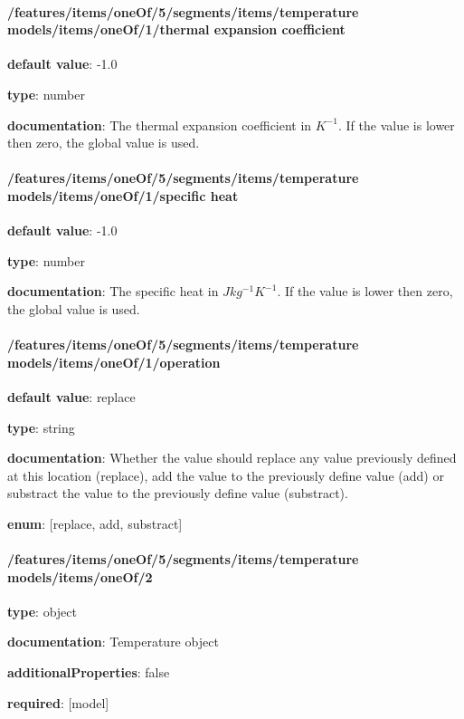 \begin{itemized}
\end{itemized}\paragraph{/features/items/oneOf/5/segments/items/temperature models/items/oneOf/1/thermal expansion coefficient} \begin{itemized}
\item {\bf default value}: -1.0
\item {\bf type}: number
\item {\bf documentation}: The thermal expansion coefficient in $K^{-1}$. If the value is lower then zero, the global value is used.
\end{itemized}\paragraph{/features/items/oneOf/5/segments/items/temperature models/items/oneOf/1/specific heat} \begin{itemized}
\item {\bf default value}: -1.0
\item {\bf type}: number
\item {\bf documentation}: The specific heat in $J kg^{-1} K^{-1}$. If the value is lower then zero, the global value is used.
\end{itemized}\paragraph{/features/items/oneOf/5/segments/items/temperature models/items/oneOf/1/operation} \begin{itemized}
\item {\bf default value}: replace
\item {\bf type}: string
\item {\bf documentation}: Whether the value should replace any value previously defined at this location (replace), add the value to the previously define value (add) or substract the value to the previously define value (substract).
\item {\bf enum}: [replace, add, substract]\end{itemized}\paragraph{/features/items/oneOf/5/segments/items/temperature models/items/oneOf/2} \begin{itemized}
\item {\bf type}: object
\item {\bf documentation}: Temperature object
\item {\bf additionalProperties}: false
\item {\bf required}: [model]\end{itemized}
